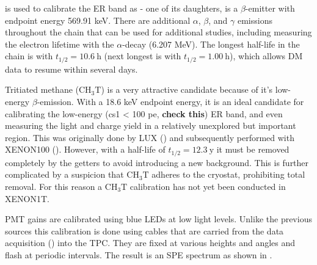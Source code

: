 \radoncal is used to calibrate the ER band as  - one of its daughters, is a $\beta$-emitter with endpoint energy
569.91 keV.  There are additional $\alpha$, $\beta$, and $\gamma$ emissions throughout the chain that can be used for additional studies,
including measuring the electron lifetime with the  $\alpha$-decay (6.207 MeV).  The longest half-life in the chain is
 with $t_{1/2} = 10.6\ \mathrm{h}$ (next longest is  with $t_{1/2} = 1.00\ \mathrm{h}$), which allows DM data
to resume within several days.

Tritiated methane ($\mathrm{C H_3 T}$) is a very attractive candidate because of it's low-energy $\beta$-emission.  With a 18.6 keV
endpoint energy, it is an ideal candidate for calibrating the low-energy (cs1 < 100 pe, \textbf{check this}) ER band, and even measuring
the light and charge yield in a relatively unexplored but important region.  This was originally done by LUX () and
subsequently performed with XENON100 ().  However, with a half-life of $t_{1/2} = 12.3\ \mathrm{y}$ it must be
removed completely by the getters to avoid introducing a new background.  This is further complicated by a suspicion that
$\mathrm{C H_3 T}$ adheres to the cryostat, prohibiting total removal.  For this reason a $\mathrm{C H_3 T}$ calibration has not yet been
conducted in XENON1T.

PMT gains are calibrated using blue LEDs at low light levels.  Unlike the previous sources this calibration is done using cables that are
carried from the data acquisition () into the TPC.  They are fixed at various heights and angles and flash
at periodic intervals.  The result is an SPE spectrum as shown in .


